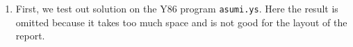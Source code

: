 \documentclass{article}
\begin{document}
\begin{enumerate}
  \item First, we test out solution on the Y86 program \verb|asumi.ys|. Here the result is omitted because it takes too much space and is not good for the layout of the report.


\end{enumerate}
\end{document}
